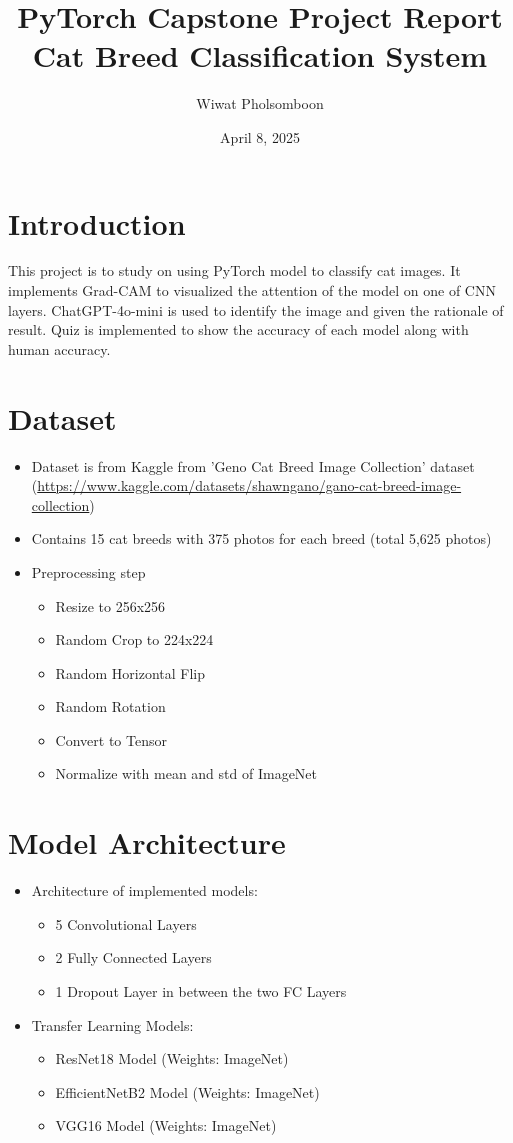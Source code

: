 \documentclass{article}
\title{\textcolor{maincolor}{\Huge PyTorch Capstone Project Report}\\
\textcolor{secondcolor}{\Large Cat Breed Classification System}}
\author{\textcolor{secondcolor}{Wiwat Pholsomboon}}
\date{\textcolor{secondcolor}{April 8, 2025}}
\begin{document}
\maketitle

\section{Introduction}
This project is to study on using PyTorch model to classify cat images. It implements Grad-CAM to visualized the attention of the model on one of CNN layers. ChatGPT-4o-mini is used to identify the image and given the rationale of result. Quiz is implemented to show the accuracy of each model along with human accuracy.

\section{Dataset}
\begin{itemize}
    \item Dataset is from Kaggle from 'Geno Cat Breed Image Collection' dataset (\url{https://www.kaggle.com/datasets/shawngano/gano-cat-breed-image-collection})
    \item Contains 15 cat breeds with 375 photos for each breed (total 5,625 photos)
    \item Preprocessing step
    \begin{itemize}
        \item Resize to 256x256
        \item Random Crop to 224x224
        \item Random Horizontal Flip
        \item Random Rotation
        \item Convert to Tensor
        \item Normalize with mean and std of ImageNet
    \end{itemize}
\end{itemize}

\section{Model Architecture}
\begin{itemize}
    \item Architecture of implemented models:
    \begin{itemize}
        \item 5 Convolutional Layers 
        \item 2 Fully Connected Layers
        \item 1 Dropout Layer in between the two FC Layers
    \end{itemize}
    \item Transfer Learning Models:
    \begin{itemize}
        \item ResNet18 Model (Weights: ImageNet)
        \item EfficientNetB2 Model (Weights: ImageNet)
        \item VGG16 Model (Weights: ImageNet)
    \end{itemize}
\end{itemize}
\end{document}
